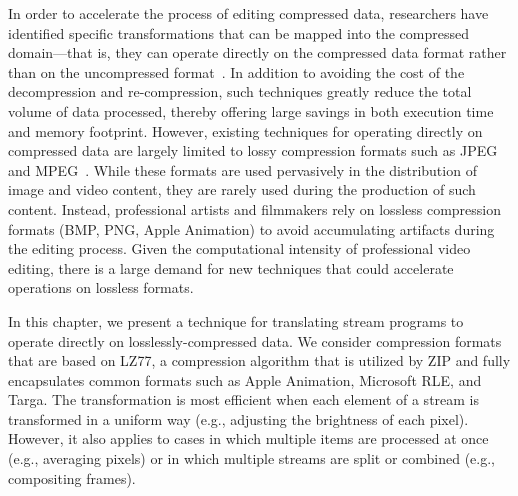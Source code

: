 In order to accelerate the process of editing compressed data,
researchers have identified specific transformations that can be
mapped into the compressed domain---that is, they can operate directly
on the compressed data format rather than on the uncompressed
format~\cite{chang95survey,mandal95survey,smith95survey,wee02survey}.
In addition to avoiding the cost of the decompression and
re-compression, such techniques greatly reduce the total volume of
data processed, thereby offering large savings in both execution time
and memory footprint.  However, existing techniques for operating
directly on compressed data are largely limited to lossy compression
formats such as
JPEG~\cite{dugad01,feng03,mukherjee02,shen96b,shen96,shen98,smith96b}
and MPEG~\cite{smith98,dorai00,nang00,vasudev98,wee02survey}.  While
these formats are used pervasively in the distribution of image and
video content, they are rarely used during the production of such
content.  Instead, professional artists and filmmakers rely on
lossless compression formats (BMP, PNG, Apple Animation) to avoid
accumulating artifacts during the editing process.  Given the
computational intensity of professional video editing, there is a
large demand for new techniques that could accelerate operations on
lossless formats.

In this chapter, we present a technique for translating stream
programs to operate directly on losslessly-compressed data.  We
consider compression formats that are based on LZ77, a compression
algorithm that is utilized by ZIP and fully encapsulates common
formats such as Apple Animation, Microsoft RLE, and Targa.  The
transformation is most efficient when each element of a stream is
transformed in a uniform way (e.g., adjusting the brightness of each
pixel).  However, it also applies to cases in which multiple items are
processed at once (e.g., averaging pixels) or in which multiple
streams are split or combined (e.g., compositing frames).

